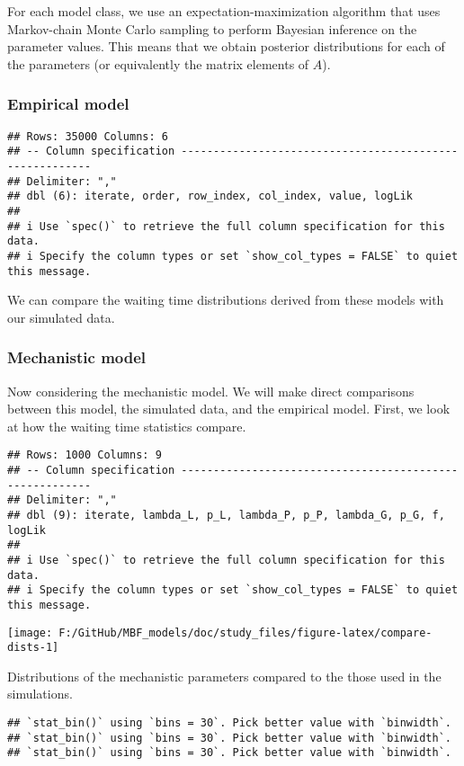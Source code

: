 \documentclass[
]{article}
\begin{document}
For each model class, we use an expectation-maximization algorithm that
uses Markov-chain Monte Carlo sampling to perform Bayesian inference on
the parameter values. This means that we obtain posterior distributions
for each of the parameters (or equivalently the matrix elements of
\(A\)).

\hypertarget{empirical-model}{%
\subsubsection{Empirical model}\label{empirical-model}}

\begin{verbatim}
## Rows: 35000 Columns: 6
## -- Column specification --------------------------------------------------------
## Delimiter: ","
## dbl (6): iterate, order, row_index, col_index, value, logLik
## 
## i Use `spec()` to retrieve the full column specification for this data.
## i Specify the column types or set `show_col_types = FALSE` to quiet this message.
\end{verbatim}

We can compare the waiting time distributions derived from these models
with our simulated data.

\hypertarget{mechanistic-model}{%
\subsubsection{Mechanistic model}\label{mechanistic-model}}

Now considering the mechanistic model. We will make direct comparisons
between this model, the simulated data, and the empirical model. First,
we look at how the waiting time statistics compare.

\begin{verbatim}
## Rows: 1000 Columns: 9
## -- Column specification --------------------------------------------------------
## Delimiter: ","
## dbl (9): iterate, lambda_L, p_L, lambda_P, p_P, lambda_G, p_G, f, logLik
## 
## i Use `spec()` to retrieve the full column specification for this data.
## i Specify the column types or set `show_col_types = FALSE` to quiet this message.
\end{verbatim}

\texttt{[image: F:/GitHub/MBF\_models/doc/study\_files/figure-latex/compare-dists-1]}

Distributions of the mechanistic parameters compared to the those used
in the simulations.

\begin{verbatim}
## `stat_bin()` using `bins = 30`. Pick better value with `binwidth`.
## `stat_bin()` using `bins = 30`. Pick better value with `binwidth`.
## `stat_bin()` using `bins = 30`. Pick better value with `binwidth`.
\end{verbatim}
\end{document}
